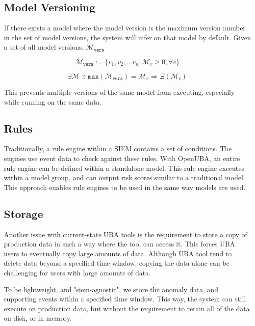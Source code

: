\documentclass[10pt, titlepage, twocolumn]{report}
\begin{document}
\subsection{Model Versioning}
If there exists a model where the model version is the maximum version number in the set of model versions, the system will infer on that model by default. Given a set of all model versions, \(\boldsymbol {\mathcal{M}}_{\texttt{vers}}\)

\begin{equation}
\boldsymbol {\mathcal{M}}_{\texttt{vers}} := \{v_1, v_2, \ldots v_n \vert \, \boldsymbol{\mathcal{M}}_v \geq 0, \forall v \}
\end{equation}

\begin{equation}
\exists \boldsymbol {\mathcal{M}} \ni \texttt{max}( \boldsymbol {\mathcal{M}}_{\texttt{vers}} ) = \boldsymbol {\mathcal{M}}_v  \Rightarrow \Xi(\boldsymbol {\mathcal{M}}_v)
\end{equation}


This prevents multiple versions of the same model from executing, especially while running on the same data.


\subsection{Rules}
Traditionally, a rule engine within a SIEM contains a set of conditions. The engines use event data to check against these rules. With OpenUBA, an entire rule engine can be defined within a standalone model. This rule engine executes within a model group, and can output risk scores similar to a traditional model. This approach enables rule engines to be used in the same way models are used. 



\subsection{Storage}
Another issue with current-state UBA tools is the requirement to store a copy of production data in such a way where the tool can access it. This forces UBA users to eventually copy large amounts of data. Although UBA tool tend to delete data beyond a specified time window, copying the data alone can be challenging for users with large amounts of data. 

To be lightweight, and "siem-agnostic", we store the anomaly data, and supporting events within a specified time window. This way, the system can still execute on production data, but without the requirement to retain all of the data on disk, or in memory.
\end{document}
